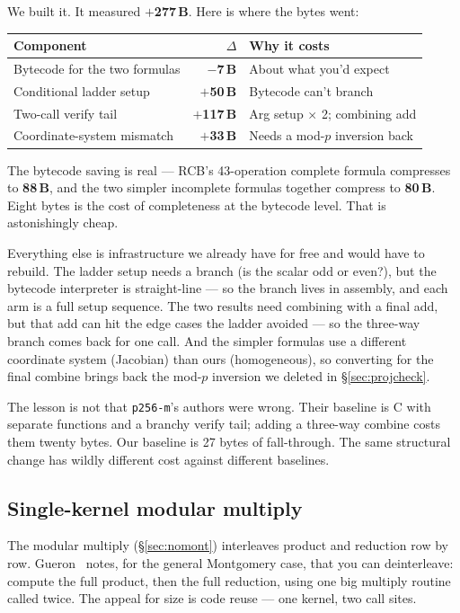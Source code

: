 \documentclass[11pt,a4paper]{article}
\newcommand{\bytes}[1]{\textcolor{blue!60!black}{\textbf{#1\,B}}}
\newcommand{\saved}[1]{\textcolor{green!50!black}{\textbf{$-$#1\,B}}}
\newcommand{\spent}[1]{\textcolor{red!70!black}{\textbf{$+$#1\,B}}}
\begin{document}
We built it. It measured \spent{277}. Here is where the bytes went:

\begin{center}
\begin{tabular}{@{}lrl@{}}
\toprule
Component & $\Delta$ & Why it costs \\
\midrule
Bytecode for the two formulas & \saved{7} & About what you'd expect \\
Conditional ladder setup       & \spent{50} & Bytecode can't branch \\
Two-call verify tail           & \spent{117} & Arg setup $\times$ 2; combining add \\
Coordinate-system mismatch     & \spent{33} & Needs a mod-$p$ inversion back \\
\bottomrule
\end{tabular}
\end{center}

The bytecode saving is real --- RCB's 43-operation complete formula
compresses to \bytes{88}, and the two simpler incomplete formulas
together compress to \bytes{80}. Eight bytes is the cost of
completeness at the bytecode level. That is astonishingly cheap.

Everything else is infrastructure we already have for free and would
have to rebuild. The ladder setup needs a branch (is the scalar odd or
even?), but the bytecode interpreter is straight-line --- so the
branch lives in assembly, and each arm is a full setup sequence. The
two results need combining with a final add, but that add can
hit the edge cases the ladder avoided --- so the three-way branch
comes back for one call. And the simpler formulas use a different
coordinate system (Jacobian) than ours (homogeneous), so converting
for the final combine brings back the mod-$p$ inversion we deleted in
\S\ref{sec:projcheck}.

The lesson is not that \texttt{p256-m}'s authors were wrong. Their
baseline is C with separate functions and a branchy verify tail; adding
a three-way combine costs them twenty bytes. Our baseline is 27 bytes
of fall-through. The same structural change has wildly different cost
against different baselines.

\subsection{Single-kernel modular multiply}

The modular multiply (\S\ref{sec:nomont}) interleaves product and
reduction row by row. Gueron~\cite{gueron} notes, for the general
Montgomery case, that you can deinterleave: compute the full product,
then the full reduction, using one big multiply routine called twice.
The appeal for size is code reuse --- one kernel, two call sites.
\end{document}
